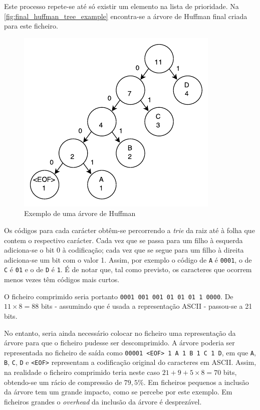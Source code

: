 Este processo repete-se até só existir um elemento na lista de prioridade. Na \autoref{fig:final_huffman_tree_example} encontra-se a árvore de Huffman final criada para este ficheiro.

\begin{figure}[H]
  \centering
  \includegraphics[width=.65\textwidth]{img/huffman_tree_example}
  \caption{Exemplo de uma árvore de Huffman}
  \label{fig:final_huffman_tree_example}
\end{figure}

Os códigos para cada carácter obtêm-se percorrendo a \textit{trie} da raiz até à folha que contem o respectivo carácter. Cada vez que se passa para um filho à esquerda adiciona-se o bit 0 à codificação; cada vez que se segue para um filho à direita adiciona-se um bit com o valor 1. Assim, por exemplo o código de \texttt{A} é \texttt{0001}, o de \texttt{C} é \texttt{01} e o de \texttt{D} é \texttt{1}. É de notar que, tal como previsto, os caracteres que ocorrem menos vezes têm códigos mais curtos.

O ficheiro comprimido seria portanto \texttt{0001 001 001 01 01 01 1 0000}. De $11 \times 8 = 88$ bits - assumindo que é usada a representação ASCII - passou-se a 21 bits.

No entanto, seria ainda necessário colocar no ficheiro uma representação da árvore para que o ficheiro pudesse ser descomprimido. A árvore poderia ser representada no ficheiro de saída como \texttt{00001 <EOF> 1 A 1 B 1 C 1 D}, em que \texttt{A}, \texttt{B}, \texttt{C}, \texttt{D} e \texttt{<EOF>} representam a codificação original do caracteres em ASCII. Assim, na realidade o ficheiro comprimido teria neste caso $21 + 9 + 5 \times 8 = 70$ bits, obtendo-se um rácio de compressão de $79,5\%$. Em ficheiros pequenos a inclusão da árvore tem um grande impacto, como se percebe por este exemplo. Em ficheiros grandes o \textit{overhead} da inclusão da árvore é desprezável.

